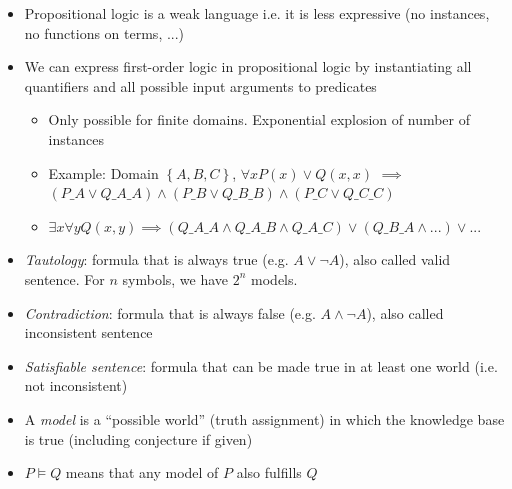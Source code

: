 \begin{itemize}
\begin{itemize}
	\end{itemize}
	\item Propositional logic is a weak language i.e. it is less expressive (no instances, no functions on terms, ...)
	\item We can express first-order logic in propositional logic by instantiating all quantifiers and all possible input arguments to predicates
	\begin{itemize}
		\item Only possible for finite domains. Exponential explosion of number of instances
		\item Example: Domain $\left\{A, B, C\right\}$, $\forall x P(x) \vee Q(x,x)$ $\implies$ $(P\_A \vee Q\_A\_A)\wedge (P\_B \vee Q\_B\_B) \wedge (P\_C \vee Q\_C\_C)$
		\item $\exists x \forall y Q(x, y) \implies (Q\_A\_A \wedge Q\_A\_B \wedge Q\_A\_C) \vee (Q\_B\_A\wedge...)\vee ...$
	\end{itemize}
	\item \textit{Tautology}: formula that is always true (e.g. $A\vee \lnot A$), also called valid sentence. For $n$ symbols, we have $2^n$ models.
	\item \textit{Contradiction}: formula that is always false (e.g. $A\wedge \lnot A$), also called inconsistent sentence
	\item \textit{Satisfiable sentence}: formula that can be made true in at least one world (i.e. not inconsistent)
	\item A \textit{model} is a ``possible world'' (truth assignment) in which the knowledge base is true (including conjecture if given)
	\item $P\models Q$ means that any model of $P$ also fulfills $Q$
\end{itemize}
